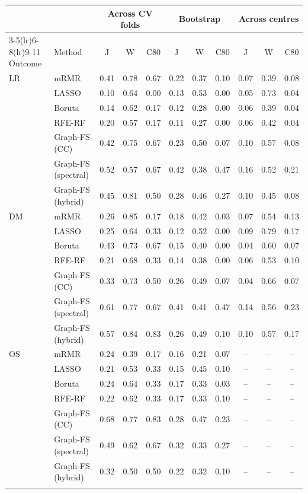 \begin{tabular}{@{}llccccccccc@{}}
\toprule
 & & \multicolumn{3}{c}{Across CV folds} & \multicolumn{3}{c}{Bootstrap} & \multicolumn{3}{c}{Across centres} \\
\cmidrule(lr){3-5}\cmidrule(lr){6-8}\cmidrule(lr){9-11}
Outcome & Method & J & W & C80 & J & W & C80 & J & W & C80 \\
\midrule
LR & mRMR & 0.41 & 0.78 & 0.67 & 0.22 & 0.37 & 0.10 & 0.07 & 0.39 & 0.08 \\
 & LASSO & 0.10 & 0.64 & 0.00 & 0.13 & 0.53 & 0.00 & 0.05 & 0.73 & 0.04 \\
 & Boruta & 0.14 & 0.62 & 0.17 & 0.12 & 0.28 & 0.00 & 0.06 & 0.39 & 0.04 \\
 & RFE-RF & 0.20 & 0.57 & 0.17 & 0.11 & 0.27 & 0.00 & 0.06 & 0.42 & 0.04 \\
 & Graph-FS (CC) & 0.42 & 0.75 & 0.67 & 0.23 & 0.50 & 0.07 & 0.10 & 0.57 & 0.08 \\
 & Graph-FS (spectral) & 0.52 & 0.57 & 0.67 & 0.42 & 0.38 & 0.47 & 0.16 & 0.52 & 0.21 \\
 & Graph-FS (hybrid) & 0.45 & 0.81 & 0.50 & 0.28 & 0.46 & 0.27 & 0.10 & 0.45 & 0.08 \\
\midrule
DM & mRMR & 0.26 & 0.85 & 0.17 & 0.18 & 0.42 & 0.03 & 0.07 & 0.54 & 0.13 \\
 & LASSO & 0.25 & 0.64 & 0.33 & 0.12 & 0.52 & 0.00 & 0.09 & 0.79 & 0.17 \\
 & Boruta & 0.43 & 0.73 & 0.67 & 0.15 & 0.40 & 0.00 & 0.04 & 0.60 & 0.07 \\
 & RFE-RF & 0.21 & 0.68 & 0.33 & 0.14 & 0.38 & 0.00 & 0.06 & 0.53 & 0.10 \\
 & Graph-FS (CC) & 0.33 & 0.73 & 0.50 & 0.26 & 0.49 & 0.07 & 0.04 & 0.66 & 0.07 \\
 & Graph-FS (spectral) & 0.61 & 0.77 & 0.67 & 0.41 & 0.41 & 0.47 & 0.14 & 0.56 & 0.23 \\
 & Graph-FS (hybrid) & 0.57 & 0.84 & 0.83 & 0.26 & 0.49 & 0.10 & 0.10 & 0.57 & 0.17 \\
\midrule
OS & mRMR & 0.24 & 0.39 & 0.17 & 0.16 & 0.21 & 0.07 & -- & -- & -- \\
 & LASSO & 0.21 & 0.53 & 0.33 & 0.15 & 0.45 & 0.10 & -- & -- & -- \\
 & Boruta & 0.24 & 0.64 & 0.33 & 0.17 & 0.33 & 0.03 & -- & -- & -- \\
 & RFE-RF & 0.22 & 0.62 & 0.33 & 0.17 & 0.33 & 0.10 & -- & -- & -- \\
 & Graph-FS (CC) & 0.68 & 0.77 & 0.83 & 0.28 & 0.47 & 0.23 & -- & -- & -- \\
 & Graph-FS (spectral) & 0.49 & 0.62 & 0.67 & 0.32 & 0.33 & 0.27 & -- & -- & -- \\
 & Graph-FS (hybrid) & 0.32 & 0.50 & 0.50 & 0.22 & 0.32 & 0.10 & -- & -- & -- \\
\botrule
\end{tabular}
